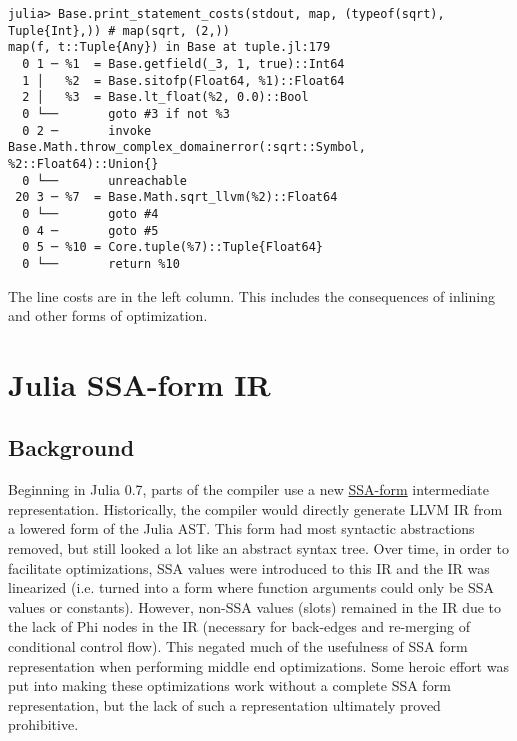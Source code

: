 \begin{verbatim}
julia> Base.print_statement_costs(stdout, map, (typeof(sqrt), Tuple{Int},)) # map(sqrt, (2,))
map(f, t::Tuple{Any}) in Base at tuple.jl:179
  0 1 ─ %1  = Base.getfield(_3, 1, true)::Int64
  1 │   %2  = Base.sitofp(Float64, %1)::Float64
  2 │   %3  = Base.lt_float(%2, 0.0)::Bool
  0 └──       goto #3 if not %3
  0 2 ─       invoke Base.Math.throw_complex_domainerror(:sqrt::Symbol, %2::Float64)::Union{}
  0 └──       unreachable
 20 3 ─ %7  = Base.Math.sqrt_llvm(%2)::Float64
  0 └──       goto #4
  0 4 ─       goto #5
  0 5 ─ %10 = Core.tuple(%7)::Tuple{Float64}
  0 └──       return %10
\end{verbatim}



The line costs are in the left column. This includes the consequences of inlining and other forms of optimization.



\hypertarget{16468279497102584880}{}


\section{Julia SSA-form IR}



\hypertarget{5370755282098388224}{}


\subsection{Background}



Beginning in Julia 0.7, parts of the compiler use a new \href{https://en.wikipedia.org/wiki/Static\_single\_assignment\_form}{SSA-form} intermediate representation. Historically, the compiler would directly generate LLVM IR from a lowered form of the Julia AST. This form had most syntactic abstractions removed, but still looked a lot like an abstract syntax tree. Over time, in order to facilitate optimizations, SSA values were introduced to this IR and the IR was linearized (i.e. turned into a form where function arguments could only be SSA values or constants). However, non-SSA values (slots) remained in the IR due to the lack of Phi nodes in the IR (necessary for back-edges and re-merging of conditional control flow). This negated much of the usefulness of SSA form representation when performing middle end optimizations. Some heroic effort was put into making these optimizations work without a complete SSA form representation, but the lack of such a representation ultimately proved prohibitive.



